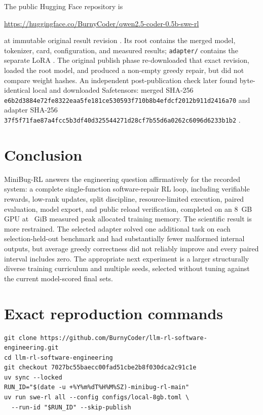\documentclass[11pt]{article}
\begin{document}
The public Hugging Face repository is
\begin{center}
\url{https://huggingface.co/BurnyCoder/qwen2.5-coder-0.5b-swe-rl}
\end{center}
at immutable original result revision \texttt{\HubRevision}. Its root contains the merged model, tokenizer, card, configuration, and measured results; \texttt{adapter/} contains the separate LoRA \cite{hubresults}. The original publish phase re-downloaded that exact revision, loaded the root model, and produced a non-empty greedy repair, but did not compare weight hashes. An independent post-publication check later found byte-identical local and downloaded Safetensors: merged SHA-256 \texttt{e6b2d3884e72fe8322eaa5fe181ce530593f710b8b4efdcf2012b911d2416a70} and adapter SHA-256 \texttt{37f5f71fae87a4fcc5b3df40d325544271d28cf7b55d6a0262c6096d6233b1b2} \cite{verification}.

\section{Conclusion}

MiniBug-RL answers the engineering question affirmatively for the recorded system: a complete single-function software-repair RL loop, including verifiable rewards, low-rank updates, split discipline, resource-limited execution, paired evaluation, model export, and public reload verification, completed on an 8~GB GPU at \TrainPeakGiB{}~GiB measured peak allocated training memory. The scientific result is more restrained. The selected adapter solved one additional task on each selection-held-out benchmark and had substantially fewer malformed internal outputs, but average greedy correctness did not reliably improve and every paired interval includes zero. The appropriate next experiment is a larger structurally diverse training curriculum and multiple seeds, selected without tuning against the current model-scored final sets.

\appendix
\section{Exact reproduction commands}

\begin{verbatim}
git clone https://github.com/BurnyCoder/llm-rl-software-engineering.git
cd llm-rl-software-engineering
git checkout 7027bc55baecc00fad51cbe2b8f030dca2c91c1e
uv sync --locked
RUN_ID="$(date -u +%Y%m%dT%H%M%SZ)-minibug-rl-main"
uv run swe-rl all --config configs/local-8gb.toml \
  --run-id "$RUN_ID" --skip-publish
\end{verbatim}
\end{document}

